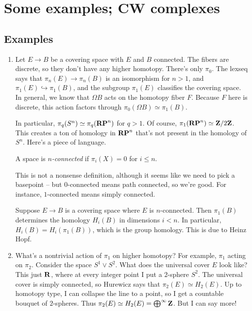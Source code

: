 \section{Some examples; CW complexes}
\subsection{Examples}
\begin{enumerate}
    \item Let $E\to B$ be a covering space with $E$ and $B$ connected. The fibers are discrete, so they don't have any higher homotopy. There's only $\pi_0$. The lexseq says that $\pi_n(E)\to \pi_n(B)$ is an isomorphism for $n>1$, and $\pi_1(E)\hookrightarrow \pi_1(B)$, and the subgroup $\pi_1(E)$ classifies the covering space. In general, we know that $\Omega B$ acts on the homotopy fiber $F$. Because $F$ here is discrete, this action factors through $\pi_0(\Omega B)\simeq \pi_1(B)$.

	In particular, $\pi_q(S^n)\simeq \pi_q(\mathbf{RP}^n)$ for $q>1$. Of course, $\pi_1(\mathbf{RP}^n)\simeq \mathbf Z/2\mathbf Z$. This creates a ton of homology in $\mathbf{RP}^n$ that's not present in the homology of $S^n$. Here's a piece of language.

	\begin{definition}
	    A space is \emph{$n$-connected} if $\pi_i(X) = 0$ for $i\leq n$.
	\end{definition}
	This is not a nonsense definition, although it seems like we need to pick a basepoint -- but $0$-connected means path connected, so we're good. For instance, $1$-connected means simply connected.

	Suppose $E\to B$ is a covering space where $E$ is $n$-connected. Then $\pi_1(B)$ determines the homology $H_i(B)$ in dimensions $i<n$. In particular, $H_i(B) = H_i(\pi_1(B))$, which is the group homology. This is due to Heinz Hopf.
    \item What's a nontrivial action of $\pi_1$ on higher homotopy? For example, $\pi_1$ acting on $\pi_2$. Consider the space $S^1\vee S^2$. What does the universal cover $E$ look like? This just $\mathbf R$, where at every integer point I put a $2$-sphere $S^2$. The universal cover is simply connected, so Hurewicz says that $\pi_2(E)\simeq H_2(E)$. Up to homotopy type, I can collapse the line to a point, so I get a countable bouquet of $2$-spheres. Thus $\pi_2(E)\simeq H_2(E) = \bigoplus^\infty\mathbf Z$. But I can say more!


\end{enumerate}
